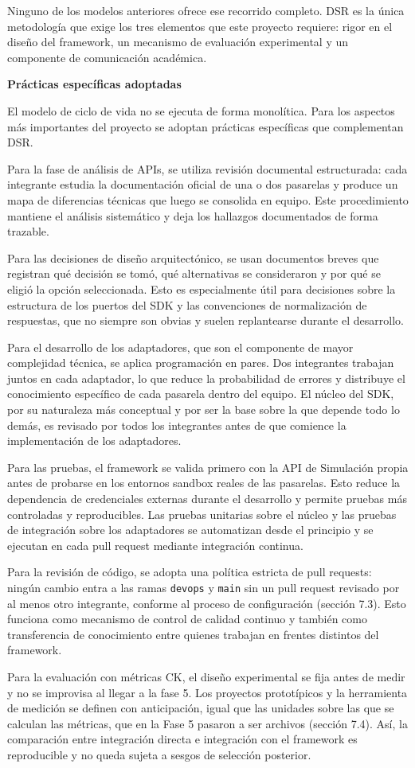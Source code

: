 Ninguno de los modelos anteriores ofrece ese recorrido completo. DSR es la única metodología que exige los tres elementos que este proyecto requiere: rigor en el diseño del framework, un mecanismo de evaluación experimental y un componente de comunicación académica.

\textbf{Prácticas específicas adoptadas}

El modelo de ciclo de vida no se ejecuta de forma monolítica. Para los aspectos más importantes del proyecto se adoptan prácticas específicas que complementan DSR.

Para la fase de análisis de APIs, se utiliza revisión documental estructurada: cada integrante estudia la documentación oficial de una o dos pasarelas y produce un mapa de diferencias técnicas que luego se consolida en equipo. Este procedimiento mantiene el análisis sistemático y deja los hallazgos documentados de forma trazable.

Para las decisiones de diseño arquitectónico, se usan documentos breves que registran qué decisión se tomó, qué alternativas se consideraron y por qué se eligió la opción seleccionada. Esto es especialmente útil para decisiones sobre la estructura de los puertos del SDK y las convenciones de normalización de respuestas, que no siempre son obvias y suelen replantearse durante el desarrollo.

Para el desarrollo de los adaptadores, que son el componente de mayor complejidad técnica, se aplica programación en pares. Dos integrantes trabajan juntos en cada adaptador, lo que reduce la probabilidad de errores y distribuye el conocimiento específico de cada pasarela dentro del equipo. El núcleo del SDK, por su naturaleza más conceptual y por ser la base sobre la que depende todo lo demás, es revisado por todos los integrantes antes de que comience la implementación de los adaptadores.

Para las pruebas, el framework se valida primero con la API de Simulación propia antes de probarse en los entornos sandbox reales de las pasarelas. Esto reduce la dependencia de credenciales externas durante el desarrollo y permite pruebas más controladas y reproducibles. Las pruebas unitarias sobre el núcleo y las pruebas de integración sobre los adaptadores se automatizan desde el principio y se ejecutan en cada pull request mediante integración continua.

Para la revisión de código, se adopta una política estricta de pull requests: ningún cambio entra a las ramas \texttt{devops} y \texttt{main} sin un pull request revisado por al menos otro integrante, conforme al proceso de configuración (sección 7.3). Esto funciona como mecanismo de control de calidad continuo y también como transferencia de conocimiento entre quienes trabajan en frentes distintos del framework.

Para la evaluación con métricas CK, el diseño experimental se fija antes de medir y no se improvisa al llegar a la fase 5. Los proyectos prototípicos y la herramienta de medición se definen con anticipación, igual que las unidades sobre las que se calculan las métricas, que en la Fase 5 pasaron a ser archivos (sección 7.4). Así, la comparación entre integración directa e integración con el framework es reproducible y no queda sujeta a sesgos de selección posterior.
